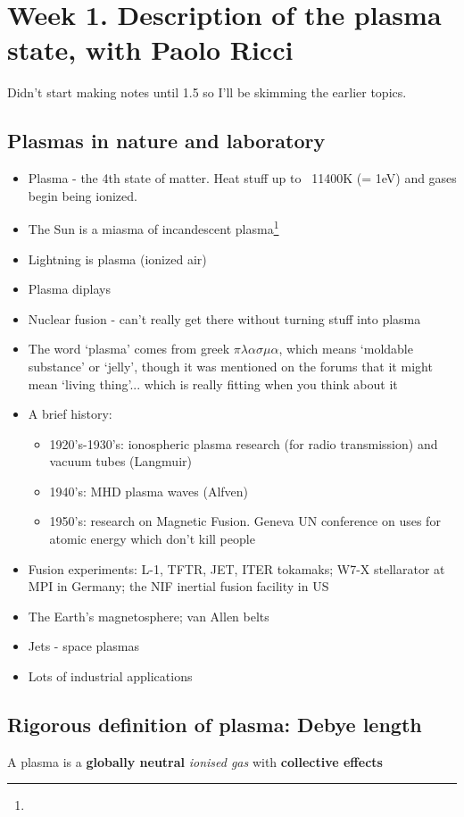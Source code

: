 \documentclass[PlasmaNotes.tex]{subfiles}
\begin{document}
\section{Week 1. Description of the plasma state, with Paolo Ricci}
Didn't start making notes until 1.5 so I'll be skimming the earlier topics.
	\subsection{Plasmas in nature and laboratory}
		\begin{itemize}
			\item Plasma - the 4th state of matter. Heat stuff up to ~11400K (= 1eV) and gases begin being ionized.
			\item The Sun is a miasma of incandescent plasma\footnote{}
			\item Lightning is plasma (ionized air)
			\item Plasma diplays
			\item Nuclear fusion - can't really get there without turning stuff into plasma
	\item The word `plasma' comes from greek $\pi\lambda\alpha\sigma\mu\alpha$, which means `moldable substance' or `jelly', though it was mentioned on the forums that it might mean `living thing'... which is really fitting when you think about it
			\item A brief history:
				\begin{itemize}
					\item 1920's-1930's: ionospheric plasma research (for radio transmission) and vacuum tubes (Langmuir)
					\item 1940's: MHD plasma waves (Alfven)
					\item 1950's: research on Magnetic Fusion. Geneva UN conference on uses for atomic energy which don't kill people
				\end{itemize}
			\item Fusion experiments: L-1, TFTR, JET, ITER tokamaks; W7-X stellarator at MPI in Germany; the NIF inertial fusion facility in US
			\item The Earth's magnetosphere; van Allen belts
			\item Jets - space plasmas
			\item Lots of industrial applications
		\end{itemize}
		
	\subsection{Rigorous definition of plasma: Debye length}
	A plasma is a \textbf{globally neutral} \emph{ionised gas} with \textbf{collective effects}
\end{document}
